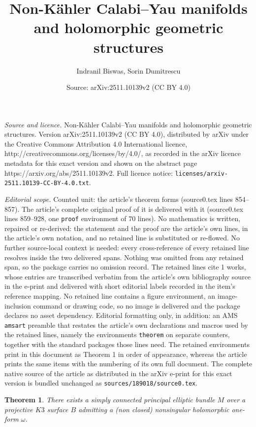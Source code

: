 \documentclass[10pt,a4paper]{amsart}
\title{Non-K\"ahler Calabi--Yau manifolds and holomorphic geometric structures}
\author{Indranil Biswas, Sorin Dumitrescu}
\date{Source: arXiv:2511.10139v2 (CC BY 4.0)}
\newtheorem{theorem}{Theorem}
\begin{document}
\maketitle

\noindent\emph{Source and licence.} Non-K\"ahler Calabi--Yau manifolds and holomorphic geometric structures. Version arXiv:2511.10139v2 (CC BY 4.0), distributed by arXiv under the Creative Commons Attribution 4.0 International licence, http://creativecommons.org/licenses/by/4.0/, as recorded in the arXiv licence metadata for this exact version and shown on the abstract page https://arxiv.org/abs/2511.10139v2. Full licence notice: \texttt{licenses/arxiv-2511.10139-CC-BY-4.0.txt}.\par\smallskip

\noindent\textit{Editorial scope.} Counted unit: the article's theorem forms (source0.tex lines 854--857). The article's complete original proof of it is delivered with it (source0.tex lines 859--928, one \texttt{proof} environment of 70 lines). No mathematics is written, repaired or re-derived: the statement and the proof are the article's own lines, in the article's own notation, and no retained line is substituted or re-flowed.  No further source-local context is needed: every cross-reference of every retained line resolves inside the two delivered spans.  Nothing was omitted from any retained span, so the package carries no omission record.  The retained lines cite 1 works, whose entries are transcribed verbatim from the article's own bibliography source in the e-print and delivered with short editorial labels recorded in the item's reference mapping.  No retained line contains a figure environment, an image-inclusion command or drawing code, so no image is delivered and the package declares no asset dependency.  Editorial formatting only, in addition: an AMS \texttt{amsart} preamble that restates the article's own declarations and macros used by the retained lines, namely the environments \texttt{theorem} on separate counters, together with the standard packages those lines need.  The retained environments print in this document as Theorem 1 in order of appearance, whereas the article prints the same items with the numbering of its own full document.  The complete native source of the article as distributed in the arXiv e-print for this exact version is bundled unchanged as \texttt{sources/189018/source0.tex}.
\begin{theorem}\label{simply connected with forms}
There exists a simply connected principal elliptic bundle $M$ over a projective $K3$ surface $B$ admitting 
a (non closed) nonsingular holomorphic one-form $\omega$.
\end{theorem} 
\end{document}
